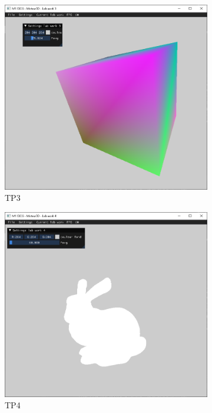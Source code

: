\documentclass[10pt,a4paper]{article}
\begin{document}
\begin{figure}[!ht]
			\begin{subfigure}[b]{0.32\textwidth}
				\centering
				\includegraphics[width=.9\textwidth]{figures/TP3.png}
				\caption{TP3}\label{fig:TP3}
			\end{subfigure}
			\hfill
			\begin{subfigure}[b]{0.32\textwidth}
				\centering
				\includegraphics[width=.9\textwidth]{figures/TP4.png}
				\caption{TP4}\label{fig:TP4}
			\end{subfigure}
			\hfill
			\begin{subfigure}[b]{0.32\textwidth}

\end{subfigure}
\end{figure}
\end{document}
